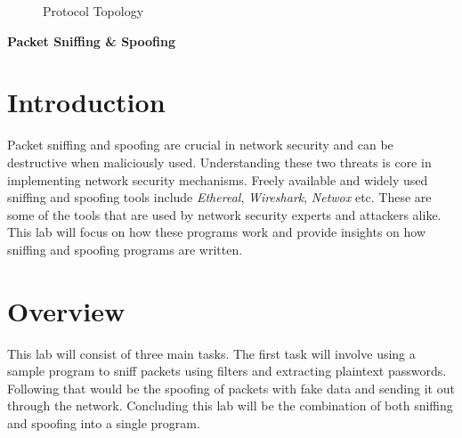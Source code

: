 \documentclass[a4paper,12pt]{article}
\begin{document}
\begin{figure}[H]
				\caption{Protocol Topology}
					\label{fig:TCPIPTree}
				\end{figure}
\begin{titlepage}
		\begin{center}
		\vspace*{27em}
		\Huge
			\textbf{Packet Sniffing \& Spoofing}
			\vfill
		\end{center}
	\end{titlepage}
	
	\newpage
	\setcounter{section}{0}
	\section{Introduction}
Packet sniffing and spoofing are crucial in network security and can be destructive when maliciously used. Understanding these two threats is core in implementing network security mechanisms. Freely available and widely used sniffing and spoofing tools include \textit{Ethereal}, \textit{Wireshark}, \textit{Netwox} etc. These are some of the tools that are used by network security experts and attackers alike. This lab will focus on how these programs work and provide insights on how sniffing and spoofing programs are written.
\section{Overview}
This lab will consist of three main tasks. The first task will involve using a sample program to sniff packets using filters and extracting plaintext passwords. Following that would be the spoofing of packets with fake data and sending it out through the network. Concluding this lab will be the combination of both sniffing and spoofing into a single program.
\end{document}
